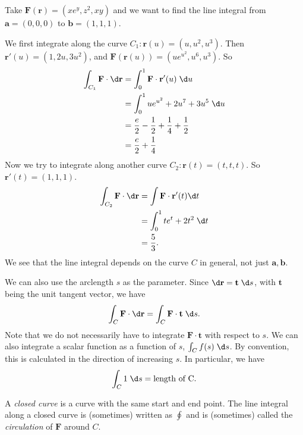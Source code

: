 \documentclass[a4paper]{article}
\begin{document}
\begin{eg}
  Take $\mathbf{F}(\mathbf{r}) = (xe^y, z^2, xy)$ and we want to find the line integral from $\mathbf{a}=(0, 0, 0)$ to $\mathbf{b}=(1, 1, 1)$.
  \begin{center}
  \end{center}
  We first integrate along the curve $C_1: \mathbf{r}(u) = (u, u^2, u^3)$. Then $\mathbf{r}'(u) = (1, 2u, 3u^2)$, and $\mathbf{F}(\mathbf{r}(u)) = (ue^{u^2}, u^6, u^3)$. So
  \begin{align*}
    \int_{C_1} \mathbf{F}\cdot \d\mathbf{r} &= \int_0^1 \mathbf{F}\cdot\mathbf{r}'(u)\; \d u\\
    &= \int_0^1 ue^{u^2} + 2u^7 + 3u^5\;\d u\\
    &= \frac{e}{2} -\frac{1}{2} + \frac{1}{4} + \frac{1}{2}\\
    &= \frac{e}{2} + \frac{1}{4}
  \end{align*}
  Now we try to integrate along another curve $C_2: \mathbf{r}(t) = (t, t, t)$. So $\mathbf{r}'(t) = (1,1, 1)$.
  \begin{align*}
    \int_{C_2} \mathbf{F}\cdot \d \mathbf{r} &= \int \mathbf{F}\cdot \mathbf{r}'(t)\d t\\
    &= \int_0^1 te^t + 2t^2\; \d t\\
    &= \frac{5}{3}.
  \end{align*}
  We see that the line integral depends on the curve $C$ in general, not just $\mathbf{a}, \mathbf{b}$.
\end{eg}

We can also use the arclength $s$ as the parameter. Since $\d \mathbf{r} = \mathbf{t}\;\d s$, with $\mathbf{t}$ being the unit tangent vector, we have
\[
  \int_C \mathbf{F}\cdot \d \mathbf{r} = \int_C \mathbf{F}\cdot \mathbf{t}\;\d s.
\]
Note that we do not necessarily have to integrate $\mathbf{F}\cdot \mathbf{t}$ with respect to $s$. We can also integrate a scalar function as a function of $s$, $\int_C f(s)\;\d s$. By convention, this is calculated in the direction of increasing $s$. In particular, we have
\[
  \int_C 1\;\d s = \text{length of C}.
\]
\begin{defi}
  A \emph{closed curve} is a curve with the same start and end point. The line integral along a closed curve is (sometimes) written as $\oint$ and is (sometimes) called the \emph{circulation} of $\mathbf{F}$ around $C$.
\end{defi}
\end{document}
